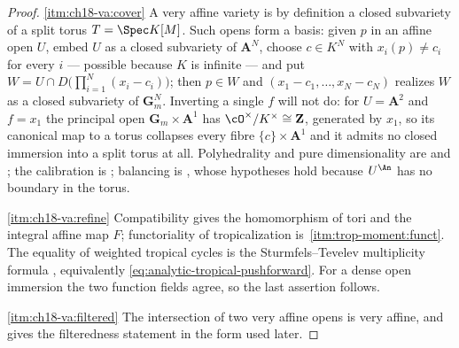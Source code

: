 \begin{proof}
\cref{itm:ch18-va:cover} A very affine variety is by definition a closed subvariety of a split torus
$T=\Spec K[M]$.  Such opens form a basis: given $p$ in an affine open
$U$, embed $U$ as a closed subvariety of $\mathbf A^N$, choose $c\in K^N$
with $x_i(p)\neq c_i$ for every $i$ --- possible because $K$ is infinite
--- and put $W=U\cap D\bigl(\prod_{i=1}^N(x_i-c_i)\bigr)$; then $p\in W$
and $(x_1-c_1,\dots,x_N-c_N)$ realizes $W$ as a closed subvariety of
$\mathbf G_m^N$.  Inverting a single $f$ will not do: for $U=\mathbf A^2$
and $f=x_1$ the principal open $\mathbf G_m\times\mathbf A^1$ has
$\cO^\times/K^\times\cong\mathbf Z$, generated by $x_1$, so its canonical
map to a torus collapses every fibre $\{c\}\times\mathbf A^1$ and it admits
no closed immersion into a split torus at all.  Polyhedrality and pure
dimensionality are  and
; the calibration is
; balancing is
, whose hypotheses hold because
$U^{\An}$ has no boundary in the torus.

\cref{itm:ch18-va:refine} Compatibility gives the homomorphism of tori and
the integral affine map $F$; functoriality of tropicalization is
\,\cref{itm:trop-moment:funct}.  The equality of
weighted tropical cycles is the Sturmfels--Tevelev multiplicity formula
\cite[(4.3.1)]{GK17}, equivalently
\eqref{eq:analytic-tropical-pushforward}.  For a dense open immersion the
two function fields agree, so the last assertion follows.

\cref{itm:ch18-va:filtered} The intersection of two very affine opens is very
affine, and  gives the filteredness statement
in the form used later.
\end{proof}

